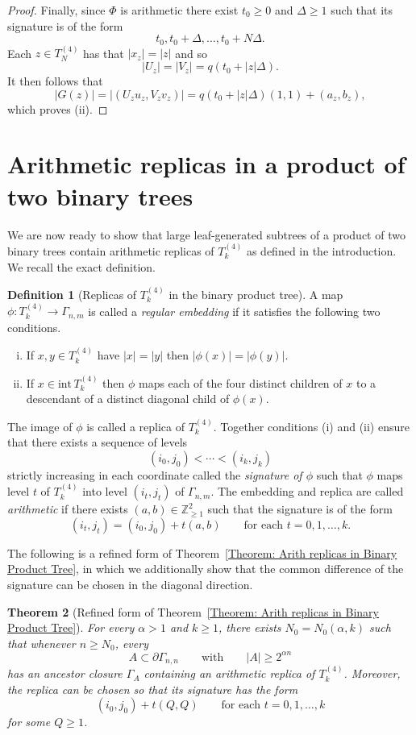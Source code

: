 \documentclass[11pt]{amsart}
\newcommand{\Z}{\mathbb{Z}}  %
\newcommand\labs[1]{\left\lvert#1\right\rvert}
\newcommand{\inte}{\mathrm{int}\,}
\renewcommand{\geq}{\geqslant}
\theoremstyle{plain}
\newtheorem{thm}{Theorem}[section]
\theoremstyle{definition}
\newtheorem{defn}[thm]{Definition}
\theoremstyle{remark}
\begin{document}
\begin{proof}
Finally, since $\Phi$ is arithmetic there exist $t_0\geq 0$ and $\Delta\geq 1$ such that its signature is of the form
\[ t_0, t_0 + \Delta, \ldots, t_0 + N\Delta.\] 
Each $z\in T_N^{(4)}$ has that $\labs{x_z} = \labs{z}$ and so
\[ \labs{U_z} = \labs{V_z} = q(t_0 + \labs{z} \Delta).\]
It then follows that
\[ \labs{G(z)} = \labs{(U_z u_z,V_z v_z)} = q(t_0 + \labs{z} \Delta)(1,1) + (a_z,b_z),\] 
which proves (ii).
\end{proof}

\section{Arithmetic replicas in a product of two binary trees}
We are now ready to show that large leaf-generated subtrees of a product of two binary trees contain arithmetic replicas of $T_k^{(4)}$ as defined in the introduction. We recall the exact definition.
\begin{defn}[Replicas of $T_k^{(4)}$ in the binary product tree]
A map $\phi: T_k^{(4)} \to \Gamma_{n,m}$ is called a \textit{regular embedding} if it satisfies the following two conditions.
\begin{enumerate}[(i)]
\item If $x,y\in T_k^{(4)}$ have $\labs{x} = \labs{y}$ then $\labs{\phi(x)} = \labs{\phi(y)}$.
\item If $x\in \inte T_k^{(4)}$ then $\phi$ maps each of the four distinct children of $x$ to a descendant of a distinct diagonal child of $\phi(x)$.
\end{enumerate} 
The image of $\phi$ is called a replica of $T_k^{(4)}$. Together conditions (i) and (ii) ensure that there exists a sequence of levels
\[  (i_0,j_0) < \cdots < (i_k,j_k) \]
strictly increasing in each coordinate called the \textit{signature of $\phi$} such that $\phi$ maps level $t$ of $T_k^{(4)}$ into level $(i_t,j_t)$ of $\Gamma_{n,m}$. The embedding and replica are called \textit{arithmetic} if there exists $(a,b)\in \Z_{\geq 1}^2$ such that the signature is of the form
\[ (i_t,j_t) = (i_0,j_0) + t (a,b) \qquad \text{for each } t=0,1,\ldots, k.\]
\end{defn}
The following is a refined form of Theorem~\ref{Theorem: Arith replicas in Binary Product Tree}, in which we additionally show that the common difference of the signature can be chosen in the diagonal direction.
\begin{thm}[Refined form of Theorem~\ref{Theorem: Arith replicas in Binary Product Tree}]\label{Thm: Refined binary product theorem}
For every $\alpha>1$ and $k\geq 1$, there exists $N_0 = N_0(\alpha,k)$ such that whenever $n\geq N_0$, every 
\[ A\subset \partial \Gamma_{n,n}\qquad \text{with} \qquad \labs{A}\geq 2^{\alpha n}\]
has an ancestor closure $\Gamma_A$ containing an arithmetic replica of $T_k^{(4)}$. Moreover, the replica can be chosen so that its signature has the form
\[ (i_0,j_0) + t (Q,Q) \qquad \text{for each } t=0,1,\ldots, k\]
for some $Q\geq 1$.
\end{thm}
\end{document}
